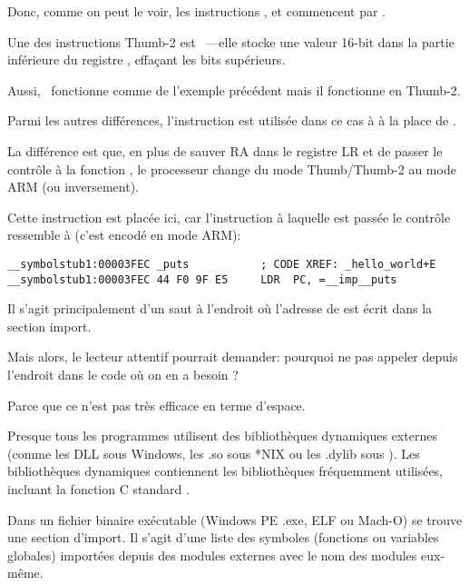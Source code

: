 
Donc, comme on peut le voir, les instructions ,  et 
commencent par .

Une des instructions Thumb-2 est  ~---elle stocke une valeur
16-bit dans la partie inférieure du registre , effaçant les bits supérieurs.

Aussi,  ~fonctionne comme  de l'exemple précédent
mais il fonctionne en Thumb-2.


Parmi les autres différences, l'instruction  est utilisée dans ce cas à
à la place de .

La différence est que, en plus de sauver \ac{RA} dans le registre \ac{LR} et de
passer le contrôle à la fonction \puts, le processeur change du mode Thumb/Thumb-2
au mode ARM (ou inversement).

Cette instruction est placée ici, car l'instruction à laquelle est passée le contrôle
ressemble à (c'est encodé en mode ARM):

\begin{lstlisting}[style=customasmARM]
__symbolstub1:00003FEC _puts           ; CODE XREF: _hello_world+E
__symbolstub1:00003FEC 44 F0 9F E5     LDR  PC, =__imp__puts
\end{lstlisting}

Il s'agit principalement d'un saut à l'endroit où l'adresse de \puts est écrit
dans la section import.

Mais alors, le lecteur attentif pourrait demander: pourquoi ne pas appeler \puts
depuis l'endroit dans le code où on en a besoin ?

Parce que ce n'est pas très efficace en terme d'espace.

Presque tous les programmes utilisent des bibliothèques dynamiques externes
(comme les DLL sous Windows, les .so sous *NIX ou les .dylib sous \MacOSX).
Les bibliothèques dynamiques contiennent les bibliothèques fréquemment utilisées,
incluant la fonction C standard \puts.

Dans un fichier binaire exécutable (Windows PE .exe, ELF ou Mach-O) se trouve
une section d'import.
Il s'agit d'une liste des symboles (fonctions ou variables globales) importées
depuis des modules externes avec le nom des modules eux-même.

